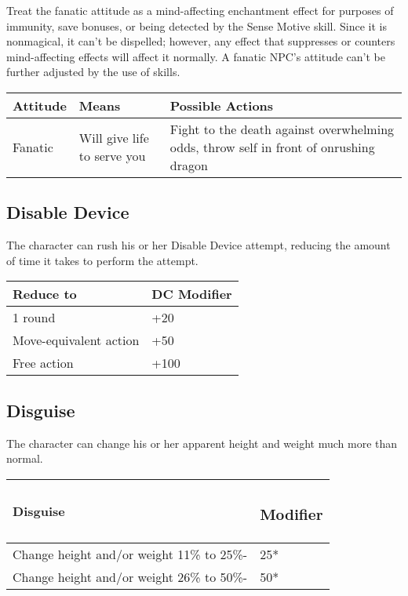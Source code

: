\documentclass{article}
\begin{document}
Treat the fanatic attitude as a mind-affecting enchantment effect for purposes 
of immunity, save bonuses, or being detected by the Sense Motive skill. Since it 
is nonmagical, it can't be dispelled; however, any effect that suppresses or counters 
mind-affecting effects will affect it normally. A fanatic NPC's attitude can't 
be further adjusted by the use of skills. 

\begin{tabular}{|>{\raggedright}p{24pt}|>{\raggedright}p{70pt}|>{\raggedright}p{219pt}|}
\hline
A\textbf{ttitude } & M\textbf{eans} & P\textbf{ossible Actions }\tabularnewline
\hline
Fanatic  & Will give life to serve you & Fight to the death against overwhelming 
odds, throw self in front of onrushing dragon \tabularnewline
\hline
\end{tabular}

\vspace{12pt}
\subsection*{Disable Device }

The character can rush his or her Disable Device attempt, reducing the amount of 
time it takes to perform the attempt.

\begin{tabular}{|>{\raggedright}p{94pt}|>{\raggedright}p{53pt}|}
\hline
R\textbf{educe to} & D\textbf{C Modifier }\tabularnewline
\hline
1 round & +20 \tabularnewline
\hline
Move-equivalent action & +50 \tabularnewline
\hline
Free action & +100 \tabularnewline
\hline
\end{tabular}

\vspace{12pt}
\subsection*{Disguise }

The character can change his or her apparent height and weight much more than normal. 

\begin{tabular}{|>{\raggedright}p{166pt}|>{\raggedright}p{36pt}|}
\hline
D\textbf{isguise} & \subsubsection*{M\textbf{odifier}}\tabularnewline
\hline
Change height and/or weight 11\% to 25\%- & 25*\tabularnewline
\hline
Change height and/or weight 26\% to 50\%- & 50*\tabularnewline
\hline
\end{tabular}
\end{document}
